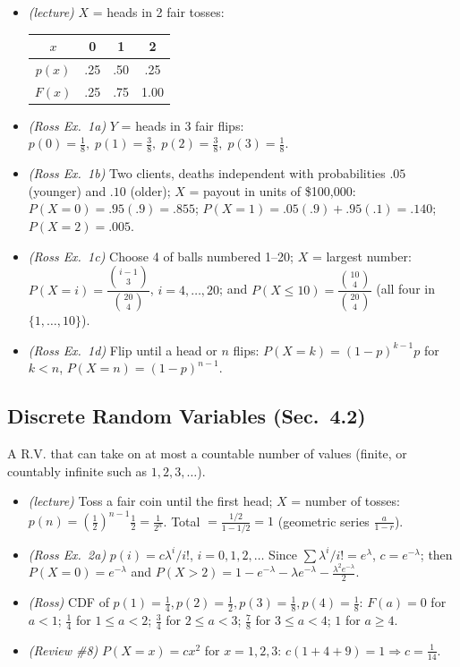 \documentclass[11pt]{article}
\let\oldsubsection\subsection
\renewcommand{\subsection}{\Needspace{14\baselineskip}\oldsubsection}
\newcommand{\nCr}[2]{\binom{#1}{#2}}
\begin{document}
\begin{exbox}[Examples]
\begin{itemize}
\item \emph{(lecture)} $X$ = heads in 2 fair tosses:
\begin{center}\begin{tabular}{c|ccc}$x$&0&1&2\\\hline$p(x)$&.25&.50&.25\\$F(x)$&.25&.75&1.00\end{tabular}\end{center}
\item \emph{(Ross Ex.\ 1a)} $Y$ = heads in 3 fair flips: $p(0)=\frac18,\;p(1)=\frac38,\;p(2)=\frac38,\;p(3)=\frac18$.
\item \emph{(Ross Ex.\ 1b)} Two clients, deaths independent with probabilities $.05$ (younger) and $.10$ (older); $X$ = payout in units of \$100{,}000: $P(X=0)=.95(.9)=.855$; $P(X=1)=.05(.9)+.95(.1)=.140$; $P(X=2)=.005$.
\item \emph{(Ross Ex.\ 1c)} Choose 4 of balls numbered 1--20; $X$ = largest number: $P(X=i)=\dfrac{\nCr{i-1}3}{\nCr{20}4}$, $i=4,\dots,20$; and $P(X\le10)=\dfrac{\nCr{10}4}{\nCr{20}4}$ (all four in $\{1,\dots,10\}$).
\item \emph{(Ross Ex.\ 1d)} Flip until a head or $n$ flips: $P(X=k)=(1-p)^{k-1}p$ for $k<n$, $P(X=n)=(1-p)^{n-1}$.
\end{itemize}
\end{exbox}

\subsection{Discrete Random Variables (Sec.\ 4.2)}

\begin{defbox}[Discrete R.V.]
A R.V. that can take on at most a countable number of values (finite, or countably infinite such as $1,2,3,\dots$).
\end{defbox}

\begin{exbox}[Examples]
\begin{itemize}
\item \emph{(lecture)} Toss a fair coin until the first head; $X$ = number of tosses: $p(n)=\left(\frac12\right)^{n-1}\frac12=\frac1{2^n}$. Total $=\frac{1/2}{1-1/2}=1$ (geometric series $\frac a{1-r}$).
\item \emph{(Ross Ex.\ 2a)} $p(i)=c\lambda^i/i!$, $i=0,1,2,\dots$ Since $\sum\lambda^i/i!=e^\lambda$, $c=e^{-\lambda}$; then $P(X=0)=e^{-\lambda}$ and $P(X>2)=1-e^{-\lambda}-\lambda e^{-\lambda}-\frac{\lambda^2e^{-\lambda}}2$.
\item \emph{(Ross)} CDF of $p(1)=\frac14,p(2)=\frac12,p(3)=\frac18,p(4)=\frac18$: $F(a)=0$ for $a<1$; $\frac14$ for $1\le a<2$; $\frac34$ for $2\le a<3$; $\frac78$ for $3\le a<4$; $1$ for $a\ge4$.
\item \emph{(Review \#8)} $P(X=x)=cx^2$ for $x=1,2,3$: $c(1+4+9)=1\Rightarrow c=\frac1{14}$.
\end{itemize}
\end{exbox}
\end{document}
